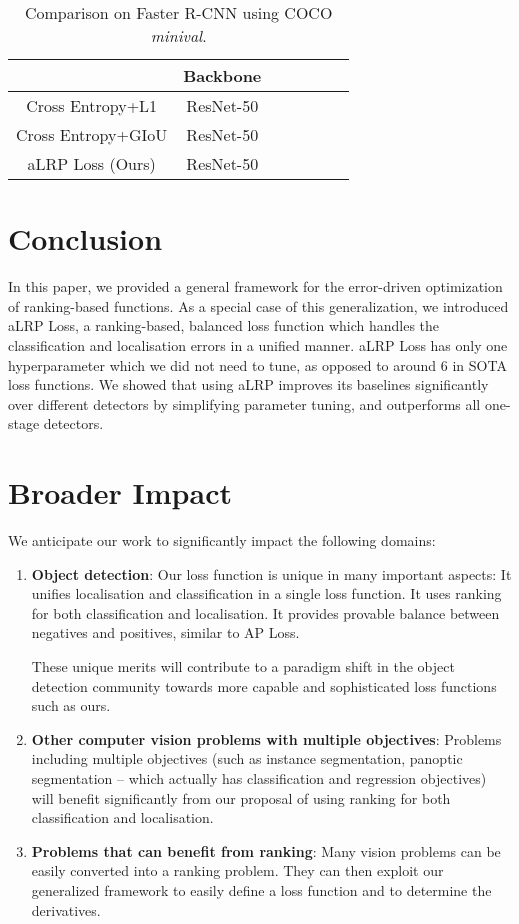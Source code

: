\documentclass{article}
\begin{document}
{\begin{table}[]
    \centering
    \caption{Comparison on Faster R-CNN using COCO \textit{minival}.}
    \label{tab:twostage}
    \begin{tabular}{|c|c|c|c|c|c|c|} \hline
    &Backbone&&&&& \\ \hline
    Cross Entropy+L1&ResNet-50&&&&&\\ \hline
    Cross Entropy+GIoU&ResNet-50&&&&&\\ \hline
aLRP Loss (Ours)&ResNet-50&&&&&\\ \hline
    \end{tabular}
\end{table}
} \section{Conclusion}
\label{sec:Conclusion}

In this paper, we provided a general framework for the error-driven optimization of ranking-based functions. As a special case of this generalization, we introduced aLRP Loss, a  ranking-based, balanced loss function which handles the classification and localisation errors in a unified manner. aLRP Loss has only one hyperparameter which we did not need to tune, as opposed to around 6 in SOTA loss functions.  We showed that using aLRP improves its baselines significantly over different detectors by simplifying parameter tuning, and outperforms all one-stage detectors. 
 \section*{Broader Impact}

We anticipate our work to significantly impact the following  domains: 
\begin{enumerate}
    \item \textbf{Object detection}: Our loss function is unique in many important aspects: It unifies localisation and classification in a single loss function. It uses ranking for both classification and localisation. It provides provable balance between negatives and positives, similar to AP Loss. 
    
    These unique merits will contribute to a paradigm shift in the object detection community towards more capable and sophisticated loss functions such as ours. 
    
    \item \textbf{Other computer vision problems with multiple objectives}: Problems including multiple objectives (such as instance segmentation, panoptic segmentation -- which actually has classification and regression objectives) will benefit significantly from our proposal of using ranking for both classification and localisation.     


    \item \textbf{Problems that can benefit from ranking}: Many vision problems can be easily converted into a ranking problem. They can then exploit our generalized framework to easily define a loss function and to determine the derivatives. 
    


\end{enumerate}
\end{document}
